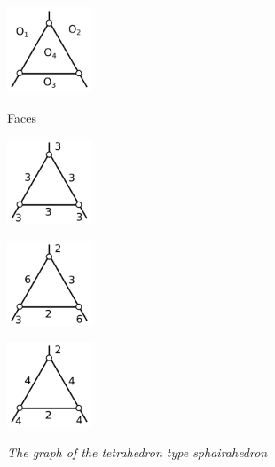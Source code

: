 \documentclass[suppldata, dvipdfmx]{interact}
\theoremstyle{plain}%
\theoremstyle{definition}
\theoremstyle{remark}
\theoremstyle{problemstyle}
\begin{document}
\begin{figure}[h!tbp]
  \begin{minipage}[t]{0.23\textwidth}
   \centering
   \includegraphics[width=1in, keepaspectratio]{./img/HexahedraWithSphericalFaces/tetrahedron/tetrahedronFaces.png}
   \caption{Faces}
   \label{fig:tetrahedronFaces}
  \end{minipage}
 \hspace*{\fill}
  \begin{minipage}[t]{0.69\textwidth}
  \begin{minipage}[t]{0.23\textwidth}
   \centering
   \includegraphics[width=1in,
   keepaspectratio]{./img/HexahedraWithSphericalFaces/tetrahedron/tetrahedron_a.png}
   \subcaption{}
   \label{fig:}
  \end{minipage}
  \hspace*{\fill}
  \begin{minipage}[t]{0.23\textwidth}
   \centering
   \includegraphics[width=1in, keepaspectratio]{./img/HexahedraWithSphericalFaces/tetrahedron/tetrahedron_b.png}
   \subcaption{}
   \label{}
  \end{minipage}
 \hspace*{\fill}
  \begin{minipage}[t]{0.23\textwidth}
   \centering
   \includegraphics[width=1in, keepaspectratio]{./img/HexahedraWithSphericalFaces/tetrahedron/tetrahedron_c.png}
   \subcaption{}
   \label{fig:}
  \end{minipage}
 \hspace*{\fill}
 \caption{\textit{The graph of the tetrahedron type sphairahedron}}
 \label{fig:tetrahedronCombinations}
  \end{minipage}
\end{figure}
\end{document}
